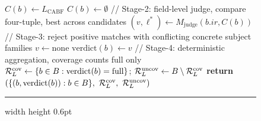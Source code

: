 \begin{figure}[tb]
\begin{algorithmic}[1]
    \State $C(b)\gets L_{\mathrm{CABF}}$ 
  \Else
    \State $C(b)\gets\emptyset$
  \EndIf
  \State // Stage-2: field-level judge, compare four-tuple, best across candidates
  \State $(v,\ell^{*})\gets M_{\mathrm{judge}}(b.\mathit{ir}, C(b))$
  \Statex {}
  \State // Stage-3: reject positive matches with conflicting concrete subject families
    \State $v\gets\text{none}$
    \Statex {}
  \EndIf
  \State $\mathrm{verdict}(b)\gets v$
\EndFor
\State // Stage-4: deterministic aggregation, coverage counts full only
\State $\mathcal{R}_L^{\mathrm{cov}}\gets\{b\in B:\mathrm{verdict}(b)=\text{full}\}$;\quad
  $\mathcal{R}_L^{\mathrm{uncov}}\gets B\setminus \mathcal{R}_L^{\mathrm{cov}}$
\State \textbf{return} $(\{(b,\mathrm{verdict}(b)):b\in B\},\ \RLcov,\ \RLunc)$
\end{algorithmic}
\vspace{1pt}
\hrule width \linewidth height 0.6pt\relax
\end{figure}
